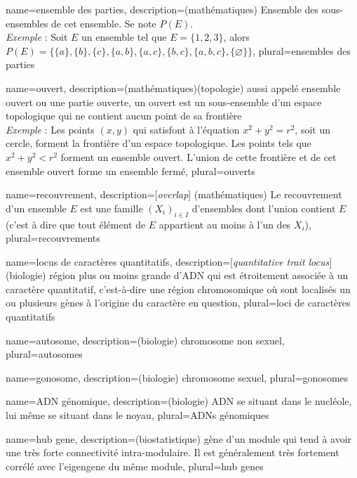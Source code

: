 {
	name={ensemble des parties},
	description={(mathématiques) Ensemble des sous-ensembles de cet ensemble. Se note $P(E)$.\\\emph{Exemple} : Soit $E$ un ensemble tel que $E=\{1,2,3\}$, alors $P(E)=\{\{a\},\{b\},\{c\},\{a,b\},\{a,c\},\{b,c\} ,\{a,b,c\},\{\varnothing\}\}$}, 
	plural={ensembles des parties}
}

{
	name={ouvert},
	description={(mathématiques)(topologie) aussi appelé ensemble ouvert ou une partie ouverte, un ouvert est un sous-ensemble d'un espace topologique qui ne contient aucun point de sa frontière\\\emph{Exemple} : Les points $(x, y)$ qui satisfont à l'équation $x^2 + y^2 = r^2$, soit un cercle, forment la frontière d'un espace topologique. Les points tels que $x^2 + y^2 < r^2$ forment un ensemble ouvert. L'union de cette frontière et de cet ensemble ouvert forme un ensemble fermé}, 
	plural={ouverts}
}

{
	name={recouvrement},
	description={[\textit{overlap}] (mathématiques) Le recouvrement d'un ensemble $E$ est une famille $(X_i)_{i\in I}$ d'ensembles dont l'union contient $E$ (c'est à dire que tout élément de $E$ appartient au moins à l'un des $X_i$)},
	plural={recouvrements}
}

{
	name={locus de caract\`eres quantitatifs},
	description={[\textit{quantitative trait locus}] (biologie) région plus ou moins grande d'ADN qui est étroitement associée à un caractère quantitatif, c'est-à-dire une région chromosomique où sont localisés un ou plusieurs gènes à l'origine du caractère en question}, 
	plural={loci de caract\`eres quantitatifs}
}

{
	name={autosome},
	description={(biologie) chromosome non sexuel}, 
	plural={autosomes}
}

{
	name={gonosome},
	description={(biologie) chromosome sexuel}, 
	plural={gonosomes}
}

{
	name={ADN g\'enomique},
	description={(biologie) ADN se situant dans le nucléole, lui même se situant dans le noyau}, 
	plural={ADNs g\'enomiques}
}

{
	name={hub gene},
	description={(biostatistique) gène d'un module qui tend à avoir une très forte connectivité intra-modulaire. Il est généralement très fortement corrélé avec l'eigengene du même module}, 
	plural={hub genes}
}

